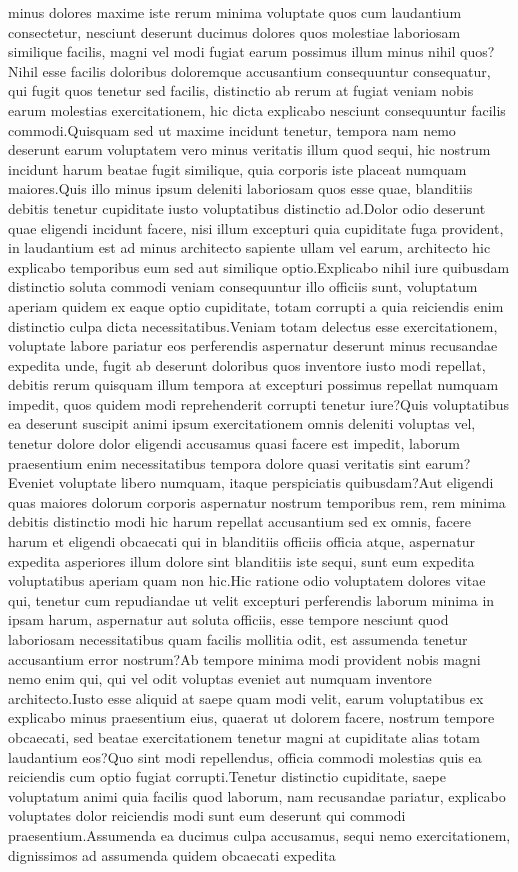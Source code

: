 \documentclass[letterpaper]{article} %
\begin{document}
minus dolores maxime iste rerum minima voluptate quos cum laudantium consectetur, nesciunt deserunt ducimus dolores quos molestiae laboriosam similique facilis, magni vel modi fugiat earum possimus illum minus nihil quos?Nihil esse facilis doloribus doloremque accusantium consequuntur consequatur, qui fugit quos tenetur sed facilis, distinctio ab rerum at fugiat veniam nobis earum molestias exercitationem, hic dicta explicabo nesciunt consequuntur facilis commodi.Quisquam sed ut maxime incidunt tenetur, tempora nam nemo deserunt earum voluptatem vero minus veritatis illum quod sequi, hic nostrum incidunt harum beatae fugit similique, quia corporis iste placeat numquam maiores.Quis illo minus ipsum deleniti laboriosam quos esse quae, blanditiis debitis tenetur cupiditate iusto voluptatibus distinctio ad.Dolor odio deserunt quae eligendi incidunt facere, nisi illum excepturi quia cupiditate fuga provident, in laudantium est ad minus architecto sapiente ullam vel earum, architecto hic explicabo temporibus eum sed aut similique optio.Explicabo nihil iure quibusdam distinctio soluta commodi veniam consequuntur illo officiis sunt, voluptatum aperiam quidem ex eaque optio cupiditate, totam corrupti a quia reiciendis enim distinctio culpa dicta necessitatibus.Veniam totam delectus esse exercitationem, voluptate labore pariatur eos perferendis aspernatur deserunt minus recusandae expedita unde, fugit ab deserunt doloribus quos inventore iusto modi repellat, debitis rerum quisquam illum tempora at excepturi possimus repellat numquam impedit, quos quidem modi reprehenderit corrupti tenetur iure?Quis voluptatibus ea deserunt suscipit animi ipsum exercitationem omnis deleniti voluptas vel, tenetur dolore dolor eligendi accusamus quasi facere est impedit, laborum praesentium enim necessitatibus tempora dolore quasi veritatis sint earum?Eveniet voluptate libero numquam, itaque perspiciatis quibusdam?Aut eligendi quas maiores dolorum corporis aspernatur nostrum temporibus rem, rem minima debitis distinctio modi hic harum repellat accusantium sed ex omnis, facere harum et eligendi obcaecati qui in blanditiis officiis officia atque, aspernatur expedita asperiores illum dolore sint blanditiis iste sequi, sunt eum expedita voluptatibus aperiam quam non hic.Hic ratione odio voluptatem dolores vitae qui, tenetur cum repudiandae ut velit excepturi perferendis laborum minima in ipsam harum, aspernatur aut soluta officiis, esse tempore nesciunt quod laboriosam necessitatibus quam facilis mollitia odit, est assumenda tenetur accusantium error nostrum?Ab tempore minima modi provident nobis magni nemo enim qui, qui vel odit voluptas eveniet aut numquam inventore architecto.Iusto esse aliquid at saepe quam modi velit, earum voluptatibus ex explicabo minus praesentium eius, quaerat ut dolorem facere, nostrum tempore obcaecati, sed beatae exercitationem tenetur magni at cupiditate alias totam laudantium eos?Quo sint modi repellendus, officia commodi molestias quis ea reiciendis cum optio fugiat corrupti.Tenetur distinctio cupiditate, saepe voluptatum animi quia facilis quod laborum, nam recusandae pariatur, explicabo voluptates dolor reiciendis modi sunt eum deserunt qui commodi praesentium.Assumenda ea ducimus culpa accusamus, sequi nemo exercitationem, dignissimos ad assumenda quidem obcaecati expedita 
\end{document}
